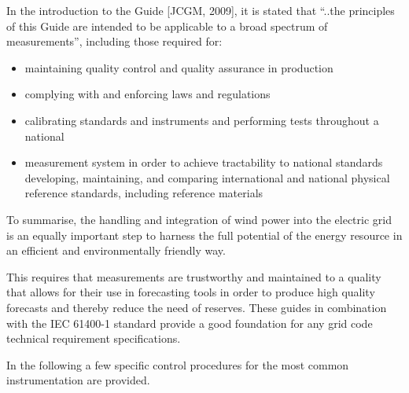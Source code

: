 In the introduction to the Guide [JCGM, 2009], it is stated that “..the principles of this Guide are intended to be applicable to a broad spectrum of measurements”, including those required for:
\begin{itemize}
   \item maintaining quality control and quality assurance in production
   \item complying with and enforcing laws and regulations
   \item calibrating standards and instruments and performing tests throughout a national 
   \item measurement system in order to achieve tractability to national standards developing, maintaining, and comparing international and national physical reference standards, including reference materials 
\end{itemize}

To summarise, the handling and integration of wind power into the electric grid is an equally important step to harness the full potential of the energy resource in an efficient and environmentally friendly way. 


This requires that measurements are trustworthy and maintained to a quality that allows for their use in forecasting tools in order to produce high quality forecasts and thereby reduce the need of reserves. These guides in combination with the IEC 61400-1 standard provide a good foundation for any grid code technical requirement specifications. 

In the following a few specific control procedures for the most common instrumentation are provided.  

